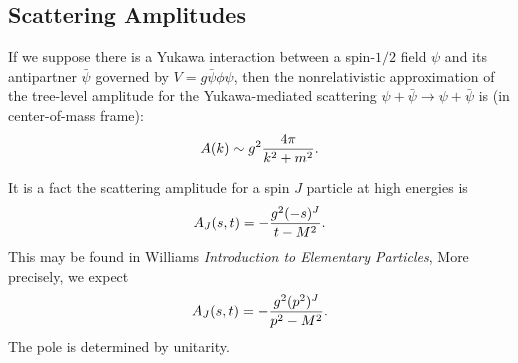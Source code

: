 \subsection{Scattering Amplitudes}


If we suppose there is a Yukawa interaction between a spin-$1/2$ field
$\psi$ and its antipartner $\bar{\psi}$ governed by
$V= g\bar{\psi}\phi\psi$, then the nonrelativistic approximation of the tree-level amplitude for the Yukawa-mediated scattering $\psi+\bar{\psi}\to\psi+\bar{\psi}$
is (in center-of-mass frame):
\begin{equation}
A(k) \sim g^{2}\frac{4\pi}{k^{2}+m^{2}}.
\end{equation}

It is a fact the scattering amplitude for a spin $J$ particle at high
energies is
\begin{equation}
A_{J}(s,t) = -\frac{g^{2}(-s)^{J}}{t-M^{2}}.
\end{equation}
This may be found in Williams \emph{Introduction to Elementary Particles},
More precisely, we expect
\begin{equation}
A_{J}(s,t) = -\frac{g^{2}(p^{2})^{J}}{p^{2}-M^{2}}.
\end{equation}
The pole is determined by unitarity. 
